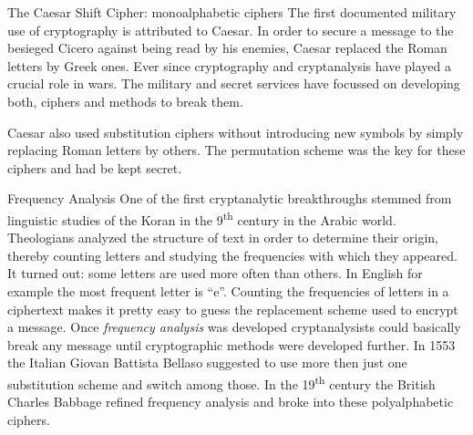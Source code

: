 \documentclass[final,hyperref={pdfpagelabels=false}]{beamer}
\begin{document}
\begin{frame}{}
\begin{columns}[t]
\begin{column}{.3\linewidth}
\begin{block}{The Caesar Shift Cipher: monoalphabetic ciphers}
          The first documented military use of cryptography is attributed to Caesar. In order to secure a message to the besieged Cicero against being read by his enemies, Caesar replaced the Roman letters by Greek ones. Ever since cryptography and cryptanalysis have played a crucial role in wars. The military and secret services have focussed on developing both, ciphers and methods to break them. \par
          Caesar also used substitution ciphers without introducing new symbols by simply replacing Roman letters by others. The permutation scheme was the key for these ciphers and had be kept secret.
        \end{block}

        \begin{block}{Frequency Analysis}
          One of the first cryptanalytic breakthroughs stemmed from linguistic studies of the Koran in the 9\textsuperscript{th} century in the Arabic world. Theologians analyzed the structure of text in order to determine their origin, thereby counting letters and studying the frequencies with which they appeared. It turned out: some letters are used more often than others. In English for example the most frequent letter is ``e''. Counting the frequencies of letters in a ciphertext makes it pretty easy to guess the replacement scheme used to encrypt a message. Once {\em frequency analysis} was developed cryptanalysists could basically break any message until cryptographic methods were developed further. In 1553 the Italian Giovan Battista Bellaso suggested to use more then just one substitution scheme and switch among those. In the 19\textsuperscript{th} century the British Charles Babbage refined frequency analysis and broke into these polyalphabetic ciphers.
        \end{block}


\end{column}
\end{columns}
\end{frame}
\end{document}

